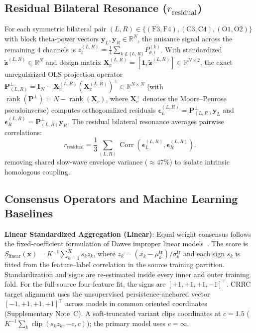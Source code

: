 \documentclass[journal,twoside,web]{ieeecolor}
\begin{document}
\subsection{Residual Bilateral Resonance ($r_{\text{residual}}$)}

For each symmetric bilateral pair $(L, R) \in \{(\text{F3}, \text{F4}), (\text{C3}, \text{C4}), (\text{O1}, \text{O2})\}$ with block theta-power vectors $\mathbf{y}_L, \mathbf{y}_R \in \mathbb{R}^N$, the nuisance signal across the remaining 4 channels is $z_t^{(L, R)} = \frac{1}{4}\sum_{k \notin \{L, R\}} P_{\theta, t}^{(k)}$. With standardized $\tilde{\mathbf{z}}^{(L, R)} \in \mathbb{R}^N$ and design matrix $\mathbf{X}_c^{(L, R)} = [\mathbf{1}, \tilde{\mathbf{z}}^{(L, R)}] \in \mathbb{R}^{N \times 2}$, the exact unregularized OLS projection operator $\mathbf{P}_{(L, R)}^\perp = \mathbf{I}_N - \mathbf{X}_c^{(L, R)} (\mathbf{X}_c^{(L, R)})^+ \in \mathbb{R}^{N \times N}$ (with $\operatorname{rank}(\mathbf{P}^\perp) = N - \operatorname{rank}(\mathbf{X}_c)$, where $\mathbf{X}_c^+$ denotes the Moore--Penrose pseudoinverse) computes orthogonalized residuals $\boldsymbol{\epsilon}_L^{(L, R)} = \mathbf{P}_{(L, R)}^\perp \mathbf{y}_L$ and $\boldsymbol{\epsilon}_R^{(L, R)} = \mathbf{P}_{(L, R)}^\perp \mathbf{y}_R$. The residual bilateral resonance averages pairwise correlations:
\begin{equation}
r_{\text{residual}} = \frac{1}{3} \sum_{(L, R)} \operatorname{Corr}(\boldsymbol{\epsilon}_L^{(L, R)}, \boldsymbol{\epsilon}_R^{(L, R)}).
\end{equation}
removing shared slow-wave envelope variance ($\approx 47\%$) to isolate intrinsic homologous coupling.

\subsection{Consensus Operators and Machine Learning Baselines}
\textbf{Linear Standardized Aggregation (Linear)}:
Equal-weight consensus follows the fixed-coefficient formulation of Dawes improper linear models~\cite{dawes1979robust}. The score is $S_{\text{linear}}(\mathbf{x})=K^{-1}\sum_{k=1}^{K}s_kz_k$, where $z_k=(x_k-\mu_k^{\text{tr}})/\sigma_k^{\text{tr}}$ and each sign $s_k$ is fitted from the feature--label correlation in the source training partition. Standardization and signs are re-estimated inside every inner and outer training fold. For the full-source four-feature fit, the signs are $[+1,+1,+1,-1]^\top$. CRRC target alignment uses the unsupervised persistence-anchored vector $[-1,+1,+1,+1]^\top$ across models in common oriented coordinates (Supplementary Note~C). A soft-truncated variant clips coordinates at $c=1.5$ ($K^{-1}\sum_k\operatorname{clip}(s_kz_k,-c,c)$); the primary model uses $c=\infty$.
\end{document}

